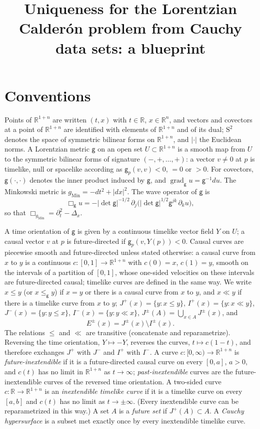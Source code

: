 \documentclass[11pt,a4paper,reqno]{amsart}
\theoremstyle{definition}
\numberwithin{equation}{section}
\newcommand{\R}{\mathbb{R}}
\newcommand{\sg}{\mathsf{g}}
\newcommand{\gM}{g_{\mathrm{Min}}}
\newcommand{\grad}{\operatorname{grad}}
\newcommand{\Sym}{\mathrm{S}^2}
\newcommand{\Ehor}{E}
\begin{document}
\title[Uniqueness from Cauchy data sets]{Uniqueness for the Lorentzian Calder\'on problem from Cauchy data sets: a blueprint}
\maketitle

\section{Conventions}\label{conventions}

Points of $\R^{1+n}$ are written $(t,x)$ with $t\in\R$, $x\in\R^n$, and vectors and covectors at a point of $\R^{1+n}$
are identified with elements of $\R^{1+n}$ and of its dual; $\Sym$ denotes the space of symmetric bilinear forms on
$\R^{1+n}$, and $|\cdot|$ the Euclidean norms. A Lorentzian metric $\sg$ on an open set $U\subset\R^{1+n}$ is a smooth map
from $U$ to the symmetric bilinear forms of signature $(-,+,\dots,+)$: a vector $v\ne0$ at $p$ is timelike, null or
spacelike according as $\sg_p(v,v)<0$, $=0$ or $>0$. For covectors, $\sg(\cdot,\cdot)$ denotes the inner product induced
by $\sg$, and $\grad_\sg u=\sg^{-1}du$. The Minkowski metric is $\gM=-dt^2+|dx|^2$. The wave operator of $\sg$ is
\[
\Box_\sg u=-|\det\sg|^{-1/2}\,\partial_j\bigl(|\det\sg|^{1/2}\sg^{jk}\,\partial_k u\bigr),
\]
so that $\Box_{\gM}=\partial_t^2-\Delta_x$.

A time orientation of $\sg$ is given by a continuous timelike vector field $Y$ on $U$; a causal vector $v$ at $p$ is
future-directed if $\sg_p(v,Y(p))<0$. Causal curves are piecewise smooth and future-directed unless stated otherwise: a
causal curve from $x$ to $y$ is a continuous $c\colon[0,1]\to\R^{1+n}$ with $c(0)=x$, $c(1)=y$, smooth on the intervals of a
partition of $[0,1]$, whose one-sided velocities on these intervals are future-directed causal; timelike curves are
defined in the same way. We write $x\le y$ (or $x\le_\sg y$) if $x=y$ or there is a causal curve from $x$ to $y$, and
$x\ll y$ if there is a timelike curve from $x$ to $y$; $J^+(x)=\{y:x\le y\}$, $I^+(x)=\{y:x\ll y\}$,
$J^-(x)=\{y:y\le x\}$, $I^-(x)=\{y:y\ll x\}$, $J^\pm(A)=\bigcup_{x\in A}J^\pm(x)$, and
\[
\Ehor^\pm(x)=J^\pm(x)\setminus I^\pm(x).
\]
The relations $\le$ and $\ll$ are transitive (concatenate and reparametrize). Reversing the time orientation, $Y\mapsto-Y$,
reverses the curves, $t\mapsto c(1-t)$, and therefore exchanges $J^+$ with $J^-$ and $I^+$ with $I^-$.
A curve $c\colon[0,\infty)\to\R^{1+n}$ is \emph{future-inextendible} if it is a future-directed causal curve on every
$[0,a]$, $a>0$, and $c(t)$ has no limit in $\R^{1+n}$ as $t\to\infty$; \emph{past-inextendible} curves are the
future-inextendible curves of the reversed time orientation. A two-sided curve $c\colon\R\to\R^{1+n}$ is an
\emph{inextendible timelike curve} if it is a timelike curve on every $[a,b]$ and $c(t)$ has no limit as $t\to\pm\infty$.
(Every inextendible curve can be reparametrized in this way.) A set $A$ is a \emph{future set} if $J^+(A)\subset A$.
A \emph{Cauchy hypersurface} is a subset met exactly once by every inextendible timelike curve.
\end{document}
